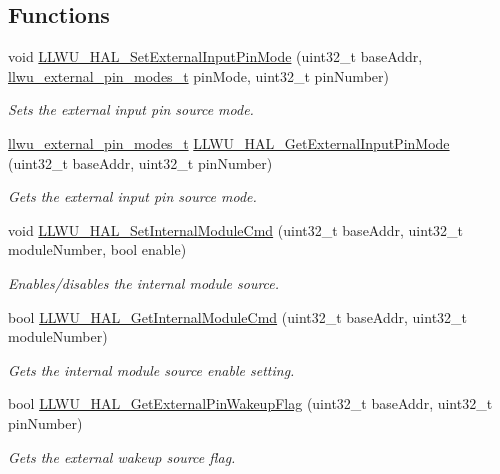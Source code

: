 \subsection*{Functions}
\begin{DoxyCompactItemize}
\item 
void \hyperlink{group__llwu__hal_ga12bdb037b1ebcaadedebd70410590622}{L\+L\+W\+U\+\_\+\+H\+A\+L\+\_\+\+Set\+External\+Input\+Pin\+Mode} (uint32\+\_\+t base\+Addr, \hyperlink{group__llwu__hal_ga7610065fdfea6c83871350572d6dae3b}{llwu\+\_\+external\+\_\+pin\+\_\+modes\+\_\+t} pin\+Mode, uint32\+\_\+t pin\+Number)
\begin{DoxyCompactList}\small\item\em Sets the external input pin source mode. \end{DoxyCompactList}\item 
\hyperlink{group__llwu__hal_ga7610065fdfea6c83871350572d6dae3b}{llwu\+\_\+external\+\_\+pin\+\_\+modes\+\_\+t} \hyperlink{group__llwu__hal_gaba129e10905228ab780feb64045b6b6f}{L\+L\+W\+U\+\_\+\+H\+A\+L\+\_\+\+Get\+External\+Input\+Pin\+Mode} (uint32\+\_\+t base\+Addr, uint32\+\_\+t pin\+Number)
\begin{DoxyCompactList}\small\item\em Gets the external input pin source mode. \end{DoxyCompactList}\item 
void \hyperlink{group__llwu__hal_gaf40ab521c96a34ebb8b10d2f3e7cea04}{L\+L\+W\+U\+\_\+\+H\+A\+L\+\_\+\+Set\+Internal\+Module\+Cmd} (uint32\+\_\+t base\+Addr, uint32\+\_\+t module\+Number, bool enable)
\begin{DoxyCompactList}\small\item\em Enables/disables the internal module source. \end{DoxyCompactList}\item 
bool \hyperlink{group__llwu__hal_ga1e6df061d14e40c6a5ae07feb39e0af3}{L\+L\+W\+U\+\_\+\+H\+A\+L\+\_\+\+Get\+Internal\+Module\+Cmd} (uint32\+\_\+t base\+Addr, uint32\+\_\+t module\+Number)
\begin{DoxyCompactList}\small\item\em Gets the internal module source enable setting. \end{DoxyCompactList}\item 
bool \hyperlink{group__llwu__hal_ga456050ff5703dfb3d56e990b5f25301f}{L\+L\+W\+U\+\_\+\+H\+A\+L\+\_\+\+Get\+External\+Pin\+Wakeup\+Flag} (uint32\+\_\+t base\+Addr, uint32\+\_\+t pin\+Number)
\begin{DoxyCompactList}\small\item\em Gets the external wakeup source flag. \end{DoxyCompactList}\item 

\end{DoxyCompactItemize}
